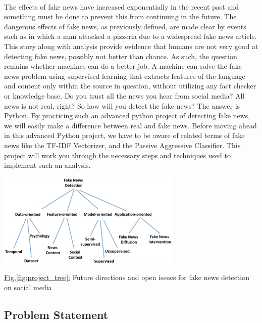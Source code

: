 \documentclass[11.5pt]{article}
\begin{document}
\begin{multicols}{2}
\paragraph{}
The effects of fake news have increased exponentially in the recent past and something must be done to prevent this from continuing in the future. The dangerous effects of fake news, as previously defined, are made clear by events such as in which a man attacked a pizzeria due to a widespread fake news article. This story along with analysis provide evidence that humans are not very good at detecting fake news, possibly not better than chance. As such, the question remains whether machines can do a better job. A machine can solve the fake news problem using supervised learning that extracts features of the language and content only within the source in question, without utilizing any fact checker or knowledge base.
\newline
Do you trust all the news you hear from social media? All news is not real, right?
So how will you detect the fake news? The answer is Python.
\newline
By practicing such an advanced python project of detecting fake news, we will easily make a difference between real and fake news. Before moving ahead in this advanced Python project, we have to be aware of related terms of fake news like the TF-IDF Vectorizer, and the Passive Aggressive Classifier.
\newline
This project will work you through the necessary steps and techniques used to implement such an analysis.
\begin{center}
    \centering
    \includegraphics[width=8.8cm]{Future directions and open issues for fake news detection on social media.jpg}
    \caption{\underline{Fig.\ref{fig:project_tree}:} Future directions and open issues for fake news detection on social media}
    \label{fig:project_tree}
\end{center}

\subsection{Problem Statement}

\end{multicols}
\end{document}
